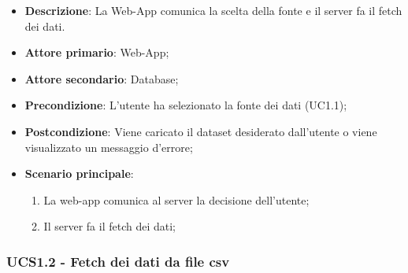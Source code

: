 \begin{itemize}

	\item \textbf{Descrizione}: La Web-App comunica la scelta della fonte e il server fa il fetch dei dati.
	
    \item \textbf{Attore primario}: Web-App;
	\item \textbf{Attore secondario}: Database;
        
    \item \textbf{Precondizione}:   L'utente ha selezionato la fonte dei dati (UC1.1);

    \item \textbf{Postcondizione}:  Viene caricato il dataset desiderato dall'utente o viene visualizzato un messaggio d'errore;

	\item \textbf{Scenario principale}:
		\begin{enumerate}
			\item La web-app comunica al server la decisione dell'utente;
            \item Il server fa il fetch dei dati;
        \end{enumerate}
	
\end{itemize}


\subsubsection{UCS1.2 - Fetch dei dati da file csv}

